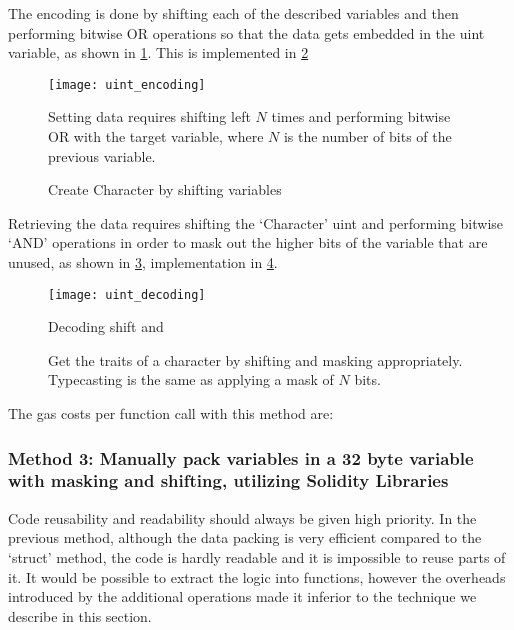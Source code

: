 The encoding is done by shifting each of the described variables and then performing bitwise OR operations so that the data gets embedded in the uint variable, as shown in \ref{fig:uint_encoding}. This is implemented in \ref{fig:uint_encoding_code}

\begin{figure}[H]
    \centering
    \texttt{[image: uint\_encoding]}
    \caption{Setting data requires shifting left $N$ times and performing bitwise OR with the target variable, where $N$ is the number of bits of the previous variable.}
    \label{fig:uint_encoding}
\end{figure}

\begin{figure}[H]
    \centering
    
    \caption{Create Character by shifting variables}
\label{fig:uint_encoding_code}
\end{figure}

Retrieving the data requires shifting the `Character' uint and performing bitwise `AND' operations in order to mask out the higher bits of the variable that are unused, as shown in \ref{fig:uint_decoding}, implementation in \ref{fig:uint_decoding_code}.

\begin{figure}[H]
    \centering
    \texttt{[image: uint\_decoding]}
    \caption{Decoding shift and}
    \label{fig:uint_decoding}
\end{figure}

\begin{figure}[H] 
    \centering
    
    \caption{Get the traits of a character by shifting and masking appropriately. Typecasting is the same as applying a mask of $N$ bits.}
    \label{fig:uint_decoding_code}
\end{figure}

The gas costs per function call with this method are: 


\subsubsection{Method 3: Manually pack variables in a 32 byte variable with masking and shifting, utilizing Solidity Libraries} \label{method3}

Code reusability and readability should always be given high priority. In the previous method, although the data packing is very efficient compared to the `struct' method, the code is hardly readable and it is impossible to reuse parts of it. It would be possible to extract the logic into functions, however the overheads introduced by the additional operations made it inferior to the technique we describe in this section.

